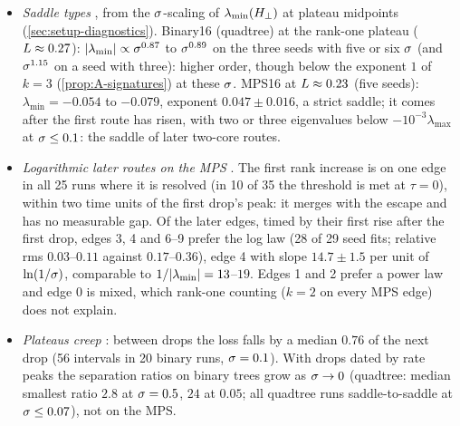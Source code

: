 \begin{itemize}
    Over the 11 series (one per order and seed) whose first route, one sibling pair, rises inside the
    second loss drop at every $\isc$ (at least four values over at least half a decade), the gap between the
    first two drops fits $A/\isc+t_0$, the $k=3$ law \eqref{eq:locality-rule} with its $O(1)$ correction
    (\cref{prop:A-head-start}), with relative rms residual at most $0.060$ and $t_0<0$ in all 11; the log law of a
    two-core route leaves $0.11$--$0.30$. A free exponent ($1.22\pm0.03$, range $1.06$--$1.36$) mostly measures
    the offset and depends on the $\isc$ range. All 11 series use raw features; the verdicts also hold over
    all 124 binary runs (\cref{app:supp-cov}).
  \item \emph{Saddle types} \empirical{} \newresult, from the $\isc$-scaling of $\lambda_{\min}(H_{\perp})$ at plateau
    midpoints (\cref{sec:setup-diagnostics}). Binary16 (quadtree) at the rank-one plateau ($L\approx0.27$):
    $\lvert\lambda_{\min}\rvert\propto\sigma^{0.87}$ to $\sigma^{0.89}$ on the three seeds with five or six $\isc$ (and $\sigma^{1.15}$ on a
    seed with three): higher order, though below the exponent $1$ of $k=3$ (\cref{prop:A-signatures}) at these $\isc$.
    MPS16 at $L\approx0.23$ (five seeds): $\lambda_{\min}=-0.054$ to $-0.079$, exponent $0.047\pm0.016$, a strict
    saddle; it comes after the first route has risen, with two or three eigenvalues below $-10^{-3}\lambda_{\max}$
    at $\sigma\le0.1$: the saddle of later two-core routes.
  \item \emph{Logarithmic later routes on the MPS} \empirical{} \newresult. The first rank increase is on
    one edge in all 25 runs where it is resolved (in 10 of 35 the threshold is met at $\tau=0$), within
    two time units of the first drop's peak: it merges with the escape and has no measurable gap. Of the
    later edges, timed by their first rise after the first drop, edges 3, 4 and 6--9 prefer the log law
    (28 of 29 seed fits; relative rms $0.03$--$0.11$ against $0.17$--$0.36$), edge 4 with slope $14.7\pm1.5$
    per unit of $\ln(1/\sigma)$, comparable to $1/\lvert\lambda_{\min}\rvert=13$--$19$. Edges 1 and 2 prefer a power
    law and edge 0 is mixed, which rank-one counting ($k=2$ on every MPS edge) does not explain.
  \item \emph{Plateaus creep} \empirical: between drops the loss falls by a median $0.76$ of the next
    drop (56 intervals in 20 binary runs, $\sigma=0.1$). With drops dated by rate peaks the separation ratios on
    binary trees grow as $\sigma\to0$ (quadtree: median smallest ratio $2.8$ at $\sigma=0.5$, $24$ at $0.05$; all quadtree
    runs saddle-to-saddle at $\sigma\le0.07$), not on the MPS.
\end{itemize}

